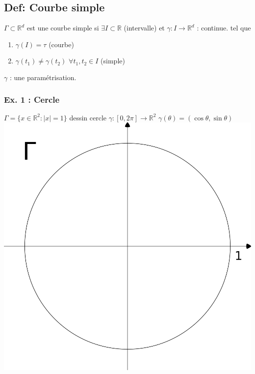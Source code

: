 \documentclass[11pt]{article}
\begin{document}
\subsection{Def: Courbe simple}
\label{sec:orgheadline15}
\(\Gamma \subset \mathbb{R}^d\) est une courbe simple si \(\exists I \subset
\mathbb{R}\)  (intervalle) et \(\gamma: I \rightarrow \mathbb{R}^d\) : continue. tel que
\begin{enumerate}
\item \(\gamma (I) = \tau\) (courbe)
\item \(\gamma (t_1) \neq \gamma(t_2)\) \(\forall t_1,t_2 \in I\) (simple)
\end{enumerate}
\(\gamma\) : une paramétrisation.

\subsubsection{Ex. 1 : Cercle}
\label{sec:orgheadline10}
\(\Gamma = \{ x \in \mathbb{R}^2 : |x|=1\}\) dessin cercle \(\gamma:
    \left[0,2\pi\right] \rightarrow \mathbb{R}^2\) \(\gamma(\theta) = (\cos
    \theta, \sin \theta)\)
\includegraphics[width=.9\linewidth]{images/an_ch2_ex_1.png}
\end{document}
